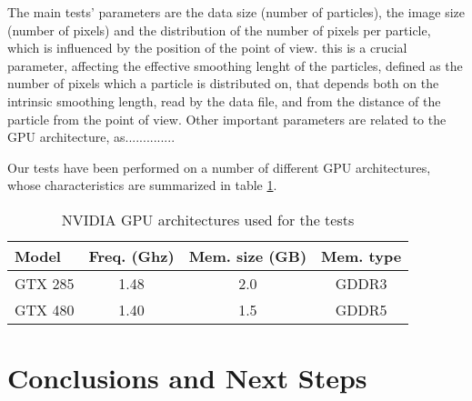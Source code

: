\documentclass[11pt]{article}
\begin{document}
The main tests' parameters are the data size (number of particles),
the image size (number of pixels) and the distribution of the number of pixels 
per particle, which is influenced by the position of the point of view.
this is a crucial parameter, affecting the effective smoothing lenght of the particles,
defined as the number of pixels which a particle is distributed on, that 
depends both on the intrinsic smoothing length, read by the data file, and 
from the distance of the particle from the point of view. Other important parameters
are related to the GPU architecture, as..............

Our tests have been performed on a number of different GPU architectures, 
whose characteristics are summarized in table \ref{table:gpus}. 

\begin{table}
\caption{NVIDIA GPU architectures used for the tests}
\centering
\begin{tabular}{l c c c}
\hline\hline
Model & Freq. (Ghz) & Mem. size (GB) & Mem. type \\ [0.5ex]
\hline %
GTX 285   & 1.48 & 2.0 & GDDR3 \\
GTX 480   & 1.40 & 1.5 & GDDR5 \\
\hline
\end{tabular}
\label{table:gpus}
\end{table}
 


\section{Conclusions and Next Steps}
\end{document}
